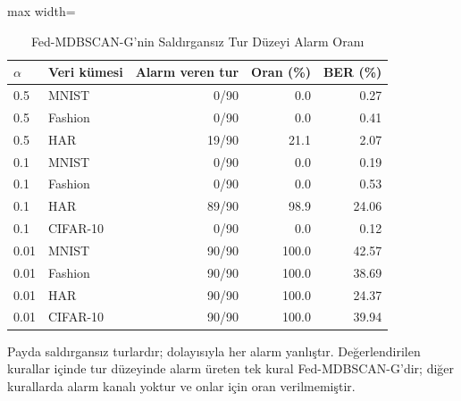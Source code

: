 \begin{table}[!t]
\centering\footnotesize
\setlength{\tabcolsep}{4pt}
\caption{Fed-MDBSCAN-G'nin Saldırgansız Tur Düzeyi Alarm Oranı}\label{tab:alarm}
\begin{adjustbox}{max width=\columnwidth}
\begin{tabular}{llrrr}
\toprule
$\alpha$ & Veri kümesi & Alarm veren tur & Oran (\%) & BER (\%) \\
\midrule
0.5 & MNIST & 0/90 & 0.0 & 0.27 \\
0.5 & Fashion & 0/90 & 0.0 & 0.41 \\
0.5 & HAR & 19/90 & 21.1 & 2.07 \\
0.1 & MNIST & 0/90 & 0.0 & 0.19 \\
0.1 & Fashion & 0/90 & 0.0 & 0.53 \\
0.1 & HAR & 89/90 & 98.9 & 24.06 \\
0.1 & CIFAR-10 & 0/90 & 0.0 & 0.12 \\
0.01 & MNIST & 90/90 & 100.0 & 42.57 \\
0.01 & Fashion & 90/90 & 100.0 & 38.69 \\
0.01 & HAR & 90/90 & 100.0 & 24.37 \\
0.01 & CIFAR-10 & 90/90 & 100.0 & 39.94 \\
\bottomrule
\end{tabular}
\end{adjustbox}

\par\vspace{3pt}\parbox{\linewidth}{\footnotesize Payda saldırgansız turlardır; dolayısıyla her alarm yanlıştır. Değerlendirilen kurallar içinde tur düzeyinde alarm üreten tek kural Fed-MDBSCAN-G'dir; diğer kurallarda alarm kanalı yoktur ve onlar için oran verilmemiştir.}
\end{table}
